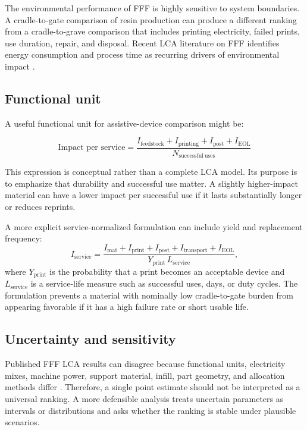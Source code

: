 \documentclass[11pt]{article}
\begin{document}
The environmental performance of FFF is highly sensitive to system boundaries. A cradle-to-gate comparison of resin production can produce a different ranking from a cradle-to-grave comparison that includes printing electricity, failed prints, use duration, repair, and disposal. Recent LCA literature on FFF identifies energy consumption and process time as recurring drivers of environmental impact \cite{sola2024}.

\subsection{Functional unit}

A useful functional unit for assistive-device comparison might be:

\begin{equation}
\text{Impact per service} = \frac{I_{\mathrm{feedstock}} + I_{\mathrm{printing}} + I_{\mathrm{post}} + I_{\mathrm{EOL}}}{N_{\mathrm{successful\ uses}}}
\end{equation}

This expression is conceptual rather than a complete LCA model. Its purpose is to emphasize that durability and successful use matter. A slightly higher-impact material can have a lower impact per successful use if it lasts substantially longer or reduces reprints.

A more explicit service-normalized formulation can include yield and replacement frequency:
\begin{equation}
I_{\mathrm{service}} = \frac{I_{\mathrm{mat}}+I_{\mathrm{print}}+I_{\mathrm{post}}+I_{\mathrm{transport}}+I_{\mathrm{EOL}}}{Y_{\mathrm{print}}\,L_{\mathrm{service}}},
\end{equation}
where $Y_{\mathrm{print}}$ is the probability that a print becomes an acceptable device and $L_{\mathrm{service}}$ is a service-life measure such as successful uses, days, or duty cycles. The formulation prevents a material with nominally low cradle-to-gate burden from appearing favorable if it has a high failure rate or short usable life.

\subsection{Uncertainty and sensitivity}

Published FFF LCA results can disagree because functional units, electricity mixes, machine power, support material, infill, part geometry, and allocation methods differ \cite{sola2024}. Therefore, a single point estimate should not be interpreted as a universal ranking. A more defensible analysis treats uncertain parameters as intervals or distributions and asks whether the ranking is stable under plausible scenarios.
\end{document}
